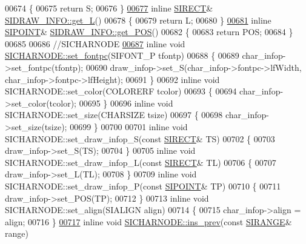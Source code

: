 \begin{DoxyCode}
00674 \{
00675     \textcolor{keywordflow}{return} S;
00676 \}
\hyperlink{class_s_i_d_r_a_w___i_n_f_o_abb4f53a14df75b907572d7d95c275b1d}{00677} \textcolor{keyword}{inline} \hyperlink{struct_s_i_r_e_c_t}{SIRECT}& \hyperlink{class_s_i_d_r_a_w___i_n_f_o_abb4f53a14df75b907572d7d95c275b1d}{SIDRAW\_INFO::get\_L}()
00678 \{
00679     \textcolor{keywordflow}{return} L;
00680 \}
\hyperlink{class_s_i_d_r_a_w___i_n_f_o_aeca1707cc1e7e849f7e4e14f8ea36503}{00681} \textcolor{keyword}{inline} \hyperlink{struct_s_i_p_o_i_n_t}{SIPOINT}& \hyperlink{class_s_i_d_r_a_w___i_n_f_o_aeca1707cc1e7e849f7e4e14f8ea36503}{SIDRAW\_INFO::get\_POS}()
00682 \{
00683     \textcolor{keywordflow}{return} POS;
00684 \}
00685 
00686 \textcolor{comment}{//SICHARNODE}
\hyperlink{class_s_i_c_h_a_r_n_o_d_e_aad179bc8f8fc9a4789e0b9ba06ecef9a}{00687} \textcolor{keyword}{inline} \textcolor{keywordtype}{void} \hyperlink{class_s_i_c_h_a_r_n_o_d_e_aad179bc8f8fc9a4789e0b9ba06ecef9a}{SICHARNODE::set\_fontpc}(SIFONT\_P tfontp)
00688 \{
00689     char\_infop->set\_fontpc(tfontp);
00690     draw\_infop->set\_S(char\_infop->fontpc->lfWidth, char\_infop->fontpc->lfHeight);
00691 \}
00692 \textcolor{keyword}{inline} \textcolor{keywordtype}{void} SICHARNODE::set\_color(COLORERF tcolor)
00693 \{
00694     char\_infop->set\_color(tcolor);
00695 \}
00696 \textcolor{keyword}{inline} \textcolor{keywordtype}{void} SICHARNODE::set\_size(CHARSIZE tsize)
00697 \{
00698     char\_infop->set\_size(tsize);
00699 \}
00700 
00701 \textcolor{keyword}{inline} \textcolor{keywordtype}{void} SICHARNODE::set\_draw\_infop\_S(\textcolor{keyword}{const} \hyperlink{struct_s_i_r_e_c_t}{SIRECT}& TS)
00702 \{
00703     draw\_infop->set\_S(TS);
00704 \}
00705 \textcolor{keyword}{inline} \textcolor{keywordtype}{void} SICHARNODE::set\_draw\_infop\_L(\textcolor{keyword}{const} \hyperlink{struct_s_i_r_e_c_t}{SIRECT}& TL)
00706 \{
00707     draw\_infop->set\_L(TL);
00708 \}
00709 \textcolor{keyword}{inline} \textcolor{keywordtype}{void} SICHARNODE::set\_draw\_infop\_P(\textcolor{keyword}{const} \hyperlink{struct_s_i_p_o_i_n_t}{SIPOINT}& TP)
00710 \{
00711     draw\_infop->set\_POS(TP);
00712 \}
00713 \textcolor{keyword}{inline} \textcolor{keywordtype}{void} SICHARNODE::set\_align(SIALIGN align)
00714 \{
00715     char\_infop->align = align;
00716 \}
\hyperlink{class_s_i_c_h_a_r_n_o_d_e_a85ebada9a5d765d7f055bab903b6c6d2}{00717} \textcolor{keyword}{inline} \textcolor{keywordtype}{void} \hyperlink{class_s_i_c_h_a_r_n_o_d_e_a0aba68c10438db18bea07bb77d70f839}{SICHARNODE::ins\_prev}(\textcolor{keyword}{const} \hyperlink{struct_s_i_r_a_n_g_e}{SIRANGE}& range)

\end{DoxyCode}
